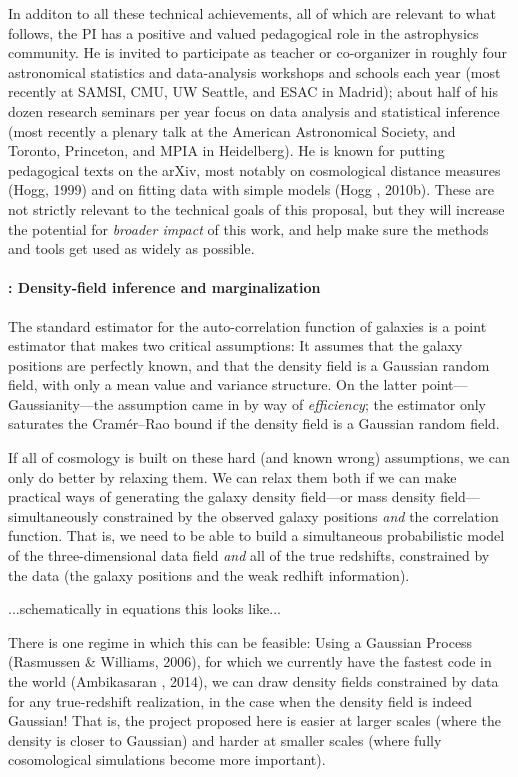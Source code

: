 \documentclass[12pt]{article}
\begin{document}
In additon to all these technical achievements, all of which are
relevant to what follows, the PI has a positive and valued pedagogical
role in the astrophysics community.
He is invited to participate as teacher or co-organizer in roughly
four astronomical statistics and data-analysis workshops and schools
each year (most recently at SAMSI, CMU, UW Seattle, and ESAC in
Madrid); about half of his dozen research seminars per year focus on
data analysis and statistical inference (most recently a plenary talk
at the American Astronomical Society, and Toronto, Princeton, and MPIA
in Heidelberg).
He is known for putting pedagogical texts on the arXiv, most notably
on cosmological distance measures (Hogg, 1999) and on fitting data
with simple models (Hogg \etal, 2010b).
These are not strictly relevant to the technical goals of this proposal,
but they will increase the potential for \emph{broader impact} of this work, and
help make sure the methods and tools get used as widely as possible.

\paragraph{: Density-field inference and marginalization}

The standard estimator for the auto-correlation function of galaxies
is a point estimator that makes two critical assumptions:
It assumes that the galaxy positions are perfectly known, and that the
density field is a Gaussian random field, with only a mean value and
variance structure.
On the latter point---Gaussianity---the assumption came in by way of
\emph{efficiency}; the estimator only saturates the Cram\'er--Rao
bound if the density field is a Gaussian random field.

If all of cosmology is built on these hard (and known wrong)
assumptions, we can only do better by relaxing them.
We can relax them both if we can make practical ways of generating the
galaxy density field---or mass density field---simultaneously
constrained by the observed galaxy positions \emph{and} the
correlation function.
That is, we need to be able to build a simultaneous probabilistic
model of the three-dimensional data field \emph{and} all of the true
redshifts, constrained by the data (the galaxy positions and the weak
redhift information).

...schematically in equations this looks like...

There is one regime in which this can be feasible:
Using a Gaussian Process (Rasmussen \& Williams, 2006), for which we currently have
the fastest code in the world (Ambikasaran \etal, 2014), we can draw density fields
constrained by data for any true-redshift realization, in the case
when the density field is indeed Gaussian!
That is, the project proposed here is easier at larger scales (where
the density is closer to Gaussian) and harder at smaller scales (where
fully cosomological simulations become more important).
\end{document}
